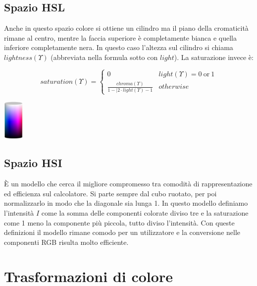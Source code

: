 \subsection{Spazio HSL}
Anche in questo spazio colore si ottiene un cilindro ma il piano della cromaticità rimane al centro, mentre la faccia superiore è completamente bianca e quella inferiore completamente nera. In questo caso l'altezza sul cilindro si chiama $lightness(\Upsilon)$ (abbreviata nella formula sotto con $light$). La saturazione invece è:\\
\begin{minipage}{.8\linewidth}
	\vspace{-.5cm}
	\begin{equation}
		saturation(\Upsilon) = 
		\begin{cases}
			0 & light(\Upsilon) = 0\ \text{or}\ 1 \\
			\frac{chroma(\Upsilon)}{1 - |2\cdot light(\Upsilon) -1} & otherwise
		\end{cases}
	\end{equation}
\end{minipage}
\hspace{.05\linewidth}
\begin{minipage}{.15\linewidth}
	\centering
	\includegraphics[width=.9\linewidth, height=2cm]{Picture/HSl_Space}
\end{minipage}
\subsection{Spazio HSI}
È un modello che cerca il migliore compromesso tra comodità di rappresentazione ed efficienza sul calcolatore. Si parte sempre dal cubo ruotato, per poi normalizzarlo in modo che la diagonale sia lunga 1. In questo modello definiamo l'intensità $I$ come la somma delle componenti colorate diviso tre e la saturazione come 1 meno la componente più piccola, tutto diviso l'intensità. Con queste definizioni il modello rimane comodo per un utilizzatore e la conversione nelle componenti RGB risulta molto efficiente.

\section{Trasformazioni di colore}
